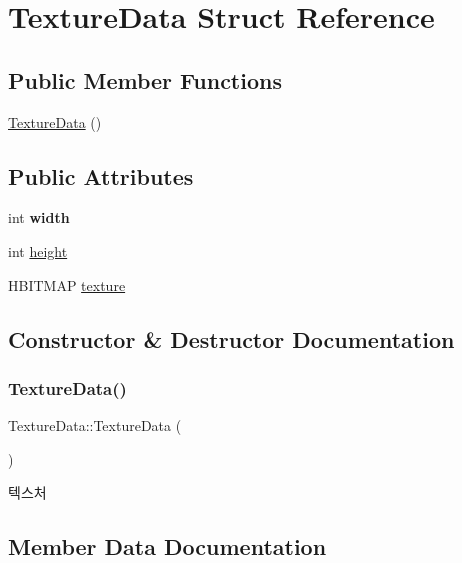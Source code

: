 \hypertarget{struct_texture_data}{}\section{Texture\+Data Struct Reference}
\label{struct_texture_data}
\subsection*{Public Member Functions}
\begin{DoxyCompactItemize}
\item 
\mbox{\hyperlink{struct_texture_data_a3ddb180b141d41ffdc5ebd73df3c6c10}{Texture\+Data}} ()
\end{DoxyCompactItemize}
\subsection*{Public Attributes}
\begin{DoxyCompactItemize}
\item 
\mbox{\label{struct_texture_data_aaa5bcfecb7dc292f2ab48b768e4d2ba4}} 
int {\bfseries width}
\item 
int \mbox{\hyperlink{struct_texture_data_a0b6dde87d3f8cad8b8faa3e3cbb67b24}{height}}
\item 
H\+B\+I\+T\+M\+AP \mbox{\hyperlink{struct_texture_data_a7e2fd3fd9d3c2e06a0f29229f486f972}{texture}}
\end{DoxyCompactItemize}


\subsection{Constructor \& Destructor Documentation}
\mbox{\label{struct_texture_data_a3ddb180b141d41ffdc5ebd73df3c6c10}} 
\subsubsection{\texorpdfstring{TextureData()}{TextureData()}}
{\footnotesize\ttfamily Texture\+Data\+::\+Texture\+Data (\begin{DoxyParamCaption}{ }\end{DoxyParamCaption})}

텍스처 

\subsection{Member Data Documentation}
\mbox{\label{struct_texture_data_a0b6dde87d3f8cad8b8faa3e3cbb67b24}} 
